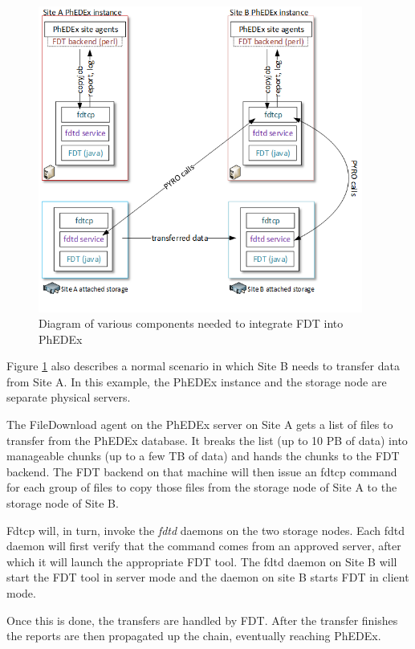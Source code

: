 \begin{figure}[h]
  \centering
  \includegraphics[width=0.95\textwidth]{Figures/PhEDEx-and-FDT-diagram.png}
  \caption{Diagram of various components needed to integrate FDT into PhEDEx}
  \label{fig:PhEDEx-FDT-arch}
\end{figure} 

Figure \ref{fig:PhEDEx-FDT-arch} also describes a normal scenario in which Site B
needs to transfer data from Site A. In this example, the PhEDEx instance and the
storage node are separate physical servers. 

The FileDownload agent on the PhEDEx server on Site A gets a list of files to
transfer from the PhEDEx database. It breaks the list (up to 10 PB of data) into
manageable chunks (up to a few TB of data) and
hands the chunks to the FDT backend. The FDT backend on that machine will then issue an fdtcp
command for each group of files to copy those files from the storage node of
Site A to the storage node of Site B.

Fdtcp will, in turn, invoke the \emph{fdtd} daemons on the two storage nodes. Each fdtd
daemon will first verify that the command comes from an approved server, after
which it will launch the appropriate FDT tool. The fdtd daemon on Site B
will start the FDT tool in server mode and the daemon on site B starts FDT in 
client mode.

Once this is done, the transfers are handled by FDT. After the transfer finishes
the reports are then propagated up the chain, eventually reaching PhEDEx.

